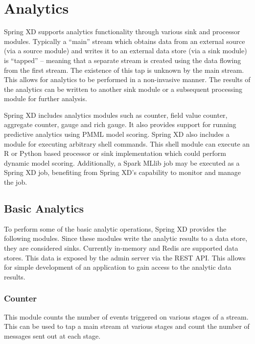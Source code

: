 \section{Analytics}
\label{sec:Analytics}

Spring XD supports analytics functionality through various sink and processor modules.
Typically a ``main'' stream which obtains data from an external source (via
a source module) and writes it to an external data store (via a sink module)
is ``tapped'' -- meaning that a separate stream is created using the data
flowing from the first stream. The existence of this tap is unknown by the
main stream. This allows for analytics to be performed in a non-invasive manner.
The results of the analytics can be written to another sink module or a
subsequent processing module for further analysis.

\par

Spring XD includes analytics modules such as counter, field value counter,
aggregate counter, gauge and rich gauge. It also provides support for running
predictive analytics using PMML model scoring. Spring XD also includes a module
for executing arbitrary shell commands. This shell module can execute an R or
Python based processor or sink implementation which could perform dynamic model
scoring. Additionally, a Spark MLlib job may be executed as a Spring XD job,
benefiting from Spring XD's capability to monitor and manage the job.

\subsection {Basic Analytics}

To perform some of the basic analytic operations, Spring XD provides the following
modules. Since these modules write the analytic results to a data store, they are
considered sinks. Currently in-memory and Redis are supported data stores. This
data is exposed by the admin server via the REST API. This allows for simple
development of an application to gain access to the analytic data results.

\subsubsection {Counter}

This module counts the number of events triggered on various stages of a stream.
This can be used to tap a main stream at various stages and count the number
of messages sent out at each stage.

